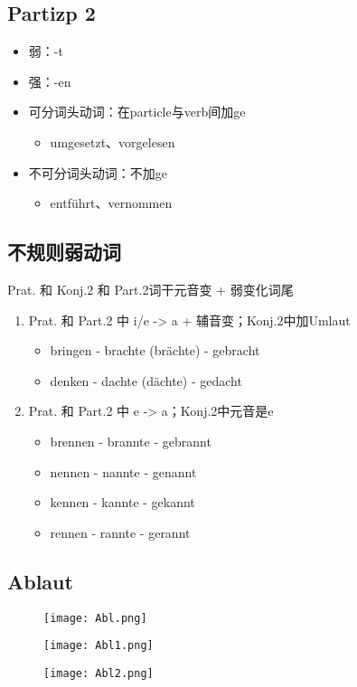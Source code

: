 \documentclass[UTF8]{report}
\begin{document}
\subsection{Partizp 2}
\begin{itemize}
    \item 弱：-t
    \item 强：-en
    \item 可分词头动词：在particle与verb间加ge
    \begin{itemize}
        \item umgesetzt、vorgelesen
    \end{itemize}
    \item 不可分词头动词：不加ge
    \begin{itemize}
        \item entführt、vernommen
    \end{itemize}
\end{itemize}

\subsection{不规则弱动词}
Prat. 和 Konj.2 和 Part.2词干元音变 + 弱变化词尾
\begin{enumerate}
    \item Prat. 和 Part.2 中 i/e -> a + 辅音变；Konj.2中加Umlaut
    \begin{itemize}
        \item bringen - brachte (brächte) - gebracht
		\item denken - dachte (dächte) - gedacht
    \end{itemize}
    \item Prat. 和 Part.2 中 e -> a；Konj.2中元音是e
    \begin{itemize}
        \item brennen - brannte - gebrannt
        \item nennen - nannte - genannt
        \item kennen - kannte - gekannt
        \item rennen - rannte - gerannt
    \end{itemize}
\end{enumerate}




\subsection{Ablaut}
\begin{figure}[H]
    \centering
    \texttt{[image: Abl.png]}
\end{figure}
\begin{figure}[H]
    \centering
    \texttt{[image: Abl1.png]}
\end{figure}
\begin{figure}[H]
    \centering
    \texttt{[image: Abl2.png]}
\end{figure}
\end{document}
